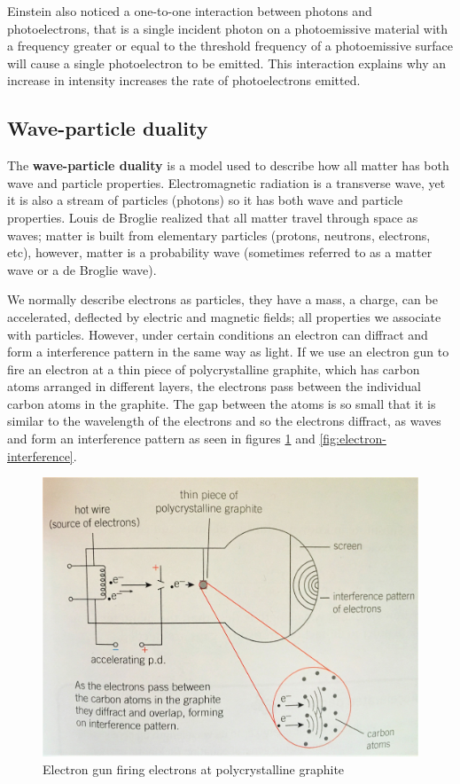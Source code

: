 Einstein also noticed a one-to-one interaction between photons and photoelectrons, that is a single incident photon on a photoemissive material with a frequency greater or equal to the threshold frequency of a photoemissive surface will cause a single photoelectron to be emitted. This interaction explains why an increase in intensity increases the rate of photoelectrons emitted. 

\subsection{Wave-particle duality}

The \textbf{wave-particle duality} is a model used to describe how all matter has both wave and particle properties. Electromagnetic radiation is a transverse wave, yet it is also a stream of particles (photons) so it has both wave and particle properties. Louis de Broglie realized that all matter travel through space as waves; matter is built from elementary particles (protons, neutrons, electrons, etc), however, matter is a probability wave (sometimes referred to as a matter wave or a de Broglie wave). 

We normally describe electrons as particles, they have a mass, a charge, can be accelerated, deflected by electric and magnetic fields; all properties we associate with particles. However, under certain conditions an electron can diffract and form a interference pattern in the same way as light. If we use an electron gun to fire an electron at a thin piece of polycrystalline graphite, which has carbon atoms arranged in different layers, the electrons pass between the individual carbon atoms in the graphite.  The gap between the atoms is so small that it is similar to the wavelength of the electrons and so the electrons diffract, as waves and form an interference pattern as seen in figures \ref{fig:electron-gun-electron-diffraction} and \ref{fig:electron-interference}.

\begin{figure}[h!]
    \centering
    \includegraphics[scale=0.1]{notes/images/Wave-Particle.JPG}
    \caption{Electron gun firing electrons at polycrystalline graphite}
    \label{fig:electron-gun-electron-diffraction}
\end{figure}
\FloatBarrier


